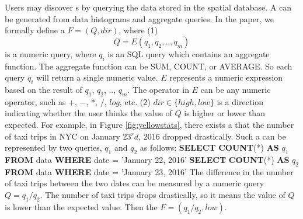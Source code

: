 Users may discover {\fact}s by querying the data stored in the spatial database. A {\fact} can be generated from data histograms and aggregate queries. In the paper, we formally define a {\fact} $F = (Q, dir)$, where (1)~$$Q = E(q_1, q_2, .., q_m)$$ is a numeric query, where $q_i$ is an SQL query which contains an aggregate function. The aggregate function can be SUM, COUNT, or AVERAGE. So each query $q_i$ will return a single numeric value. $E$ represents a numeric expression based on the result of $q_1$, $q_2$, .., $q_m$. The operator in $E$ can be any numeric operator, such as $+$, $-$, $*$, $/$, $log$, etc. (2) $dir \in \{high, low\}$ is a direction indicating whether the user thinks the value of $Q$ is higher or lower than expected.
For example, in Figure \ref{fig:yellowstats}, there exists a {\fact} that the number of taxi trips in NYC on January 23$^rd$, 2016 dropped drastically. Such a {\fact} can be represented by two queries, $q_1$ and $q_2$ as follows:
\newline \newline
\noindent
{\bf \textbf{SELECT}}  \textbf{COUNT}(*)  \textbf{AS}  $q_1$  \textbf{FROM} data
\newline
\textbf{WHERE} date = 'January 22, 2016'
\newline \newline
\noindent
{\bf \textbf{SELECT}}  \textbf{COUNT}(*)  \textbf{AS}  $q_2$  \textbf{FROM} data
\newline
\textbf{WHERE} date = 'January 23, 2016'
\newline \newline
The difference in the number of taxi trips between the two dates can be measured by a numeric query $Q = {q_1} / {q_2}$. The number of taxi trips drops drastically, so it means the value of $Q$ is lower than the expected value. Then the {\fact} $F = ({q_1} / {q_2}, low)$.


